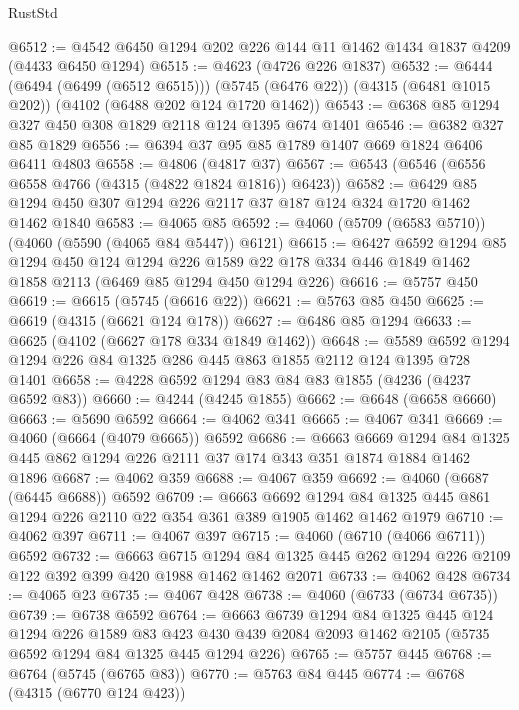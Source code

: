 \begin{lexlean}{RustStd}
\begin{coremodule}
@6512 := @4542 @6450 @1294 @202 @226 @144 @11 @1462 @1434 @1837 @4209 (@4433 @6450 @1294)
@6515 := @4623 (@4726 @226 @1837)
@6532 := @6444
    (@6494 (@6499 (@6512 @6515)))
    (@5745 (@6476 @22))
    (@4315 (@6481 @1015 @202))
    (@4102 (@6488 @202 @124 @1720 @1462))
@6543 := @6368 @85 @1294 @327 @450 @308 @1829 @2118 @124 @1395 @674 @1401
@6546 := @6382 @327 @85 @1829
@6556 := @6394 @37 @95 @85 @1789 @1407 @669 @1824 @6406 @6411 @4803
@6558 := @4806 (@4817 @37)
@6567 := @6543 (@6546 (@6556 @6558 @4766 (@4315 (@4822 @1824 @1816)) @6423))
@6582 := @6429 @85 @1294 @450 @307 @1294 @226 @2117 @37 @187 @124 @324 @1720 @1462 @1462 @1840
@6583 := @4065 @85
@6592 := @4060 (@5709 (@6583 @5710)) (@4060 (@5590 (@4065 @84 @5447)) @6121)
@6615 := @6427
    @6592
    @1294
    @85
    @1294
    @450
    @124
    @1294
    @226
    @1589
    @22
    @178
    @334
    @446
    @1849
    @1462
    @1858
    @2113
    (@6469 @85 @1294 @450 @1294 @226)
@6616 := @5757 @450
@6619 := @6615 (@5745 (@6616 @22))
@6621 := @5763 @85 @450
@6625 := @6619 (@4315 (@6621 @124 @178))
@6627 := @6486 @85 @1294
@6633 := @6625 (@4102 (@6627 @178 @334 @1849 @1462))
@6648 := @5589 @6592 @1294 @1294 @226 @84 @1325 @286 @445 @863 @1855 @2112 @124 @1395 @728 @1401
@6658 := @4228 @6592 @1294 @83 @84 @83 @1855 (@4236 (@4237 @6592 @83))
@6660 := @4244 (@4245 @1855)
@6662 := @6648 (@6658 @6660)
@6663 := @5690 @6592
@6664 := @4062 @341
@6665 := @4067 @341
@6669 := @4060 (@6664 (@4079 @6665)) @6592
@6686 := @6663
    @6669
    @1294
    @84
    @1325
    @445
    @862
    @1294
    @226
    @2111
    @37
    @174
    @343
    @351
    @1874
    @1884
    @1462
    @1896
@6687 := @4062 @359
@6688 := @4067 @359
@6692 := @4060 (@6687 (@6445 @6688)) @6592
@6709 := @6663
    @6692
    @1294
    @84
    @1325
    @445
    @861
    @1294
    @226
    @2110
    @22
    @354
    @361
    @389
    @1905
    @1462
    @1462
    @1979
@6710 := @4062 @397
@6711 := @4067 @397
@6715 := @4060 (@6710 (@4066 @6711)) @6592
@6732 := @6663
    @6715
    @1294
    @84
    @1325
    @445
    @262
    @1294
    @226
    @2109
    @122
    @392
    @399
    @420
    @1988
    @1462
    @1462
    @2071
@6733 := @4062 @428
@6734 := @4065 @23
@6735 := @4067 @428
@6738 := @4060 (@6733 (@6734 @6735))
@6739 := @6738 @6592
@6764 := @6663
    @6739
    @1294
    @84
    @1325
    @445
    @124
    @1294
    @226
    @1589
    @83
    @423
    @430
    @439
    @2084
    @2093
    @1462
    @2105
    (@5735 @6592 @1294 @84 @1325 @445 @1294 @226)
@6765 := @5757 @445
@6768 := @6764 (@5745 (@6765 @83))
@6770 := @5763 @84 @445
@6774 := @6768 (@4315 (@6770 @124 @423))

\end{coremodule}
\end{lexlean}
